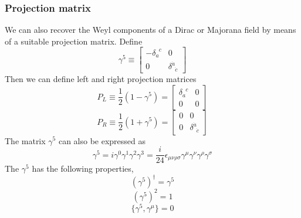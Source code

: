 \documentclass[cyan]{elegantnote}
\begin{document}
\subsubsection{Projection matrix}
\noindent
We can also recover the Weyl components of a Dirac or Majorana field by means of a suitable projection matrix. Define
\[\gamma^5 \equiv \left[ \begin{matrix} -\delta_a^{\phantom{a}c}& 0\\ 0& \delta^{\dot{a}}_{\phantom{a}\dot{c}}\end{matrix} \right]\]
Then we can define left and right projection matrices
\[P_L \equiv \frac{1}{2}(1-\gamma^5) = \left[ \begin{matrix} \delta_a^{\phantom{a}c}& 0\\ 0& 0\end{matrix} \right]\]
\[P_R \equiv \frac{1}{2}(1+\gamma^5) = \left[ \begin{matrix} 0& 0\\ 0& \delta^{\dot{a}}_{\phantom{a}\dot{c}}\end{matrix} \right]\]
The matrix $\gamma^5$ can also be expressed as
\[\gamma^5 = i \gamma^0 \gamma^1 \gamma^2 \gamma^3 = \frac{i}{24} \epsilon_{\mu \nu \rho \sigma}\gamma^{\mu} \gamma^{\nu} \gamma^{\rho} \gamma^{\sigma}\]
The $\gamma^5$ has the following properties,
\[(\gamma^5)^{\dagger} = \gamma^5\]
\[(\gamma^5)^2 = 1\]
\[\{\gamma^5,\gamma^{\mu}\} = 0\]
\end{document}
